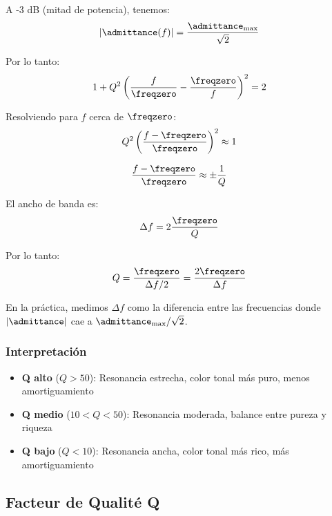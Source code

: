 A -3 dB (mitad de potencia), tenemos:
\begin{equation}
|\admittance(f)| = \frac{\admittance_{\max}}{\sqrt{2}}
\end{equation}

Por lo tanto:
\begin{equation}
1 + Q^2 \left(\frac{f}{\freqzero} - \frac{\freqzero}{f}\right)^2 = 2
\end{equation}

Resolviendo para $f$ cerca de $\freqzero$:
\begin{equation}
Q^2 \left(\frac{f - \freqzero}{\freqzero}\right)^2 \approx 1
\end{equation}

\begin{equation}
\frac{f - \freqzero}{\freqzero} \approx \pm \frac{1}{Q}
\end{equation}

El ancho de banda es:
\begin{equation}
\Delta f = 2 \frac{\freqzero}{Q}
\end{equation}

Por lo tanto:
\begin{equation}
Q = \frac{\freqzero}{\Delta f/2} = \frac{2\freqzero}{\Delta f}
\end{equation}

En la práctica, medimos $\Delta f$ como la diferencia entre las frecuencias donde $|\admittance|$ cae a $\admittance_{\max}/\sqrt{2}$.

\subsubsection{Interpretación}

\begin{itemize}
    \item \textbf{Q alto} ($Q > 50$): Resonancia estrecha, color tonal más puro, menos amortiguamiento
    \item \textbf{Q medio} ($10 < Q < 50$): Resonancia moderada, balance entre pureza y riqueza
    \item \textbf{Q bajo} ($Q < 10$): Resonancia ancha, color tonal más rico, más amortiguamiento
\end{itemize}

\subsection{Facteur de Qualité Q}

